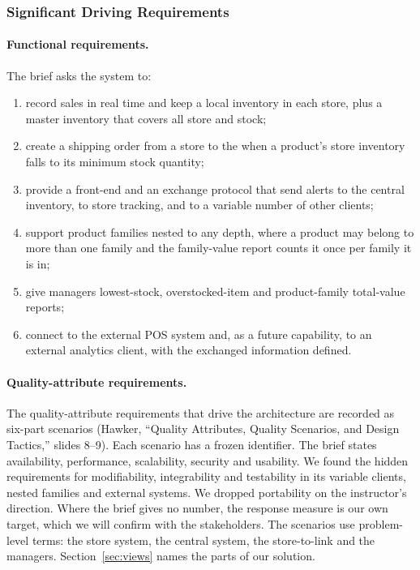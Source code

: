 \subsubsection{Significant Driving Requirements}
\label{sec:driving-requirements}

\paragraph{Functional requirements.}
The brief asks the system to:
\begin{enumerate}[label=FR-\arabic*,nosep,leftmargin=3.2em]
  \item record sales in real time and keep a local inventory in each store, plus a
  master inventory that covers all store and \DC stock;
  \item create a shipping order from a store to the \DC when a product's store inventory
  falls to its minimum stock quantity;
  \item provide a front-end and an exchange protocol that send alerts to the central
  inventory, to store tracking, and to a variable number of other clients;
  \item support product families nested to any depth, where a product may belong to more
  than one family and the family-value report counts it once per family it is in;
  \item give managers lowest-stock, overstocked-item and product-family total-value
  reports;
  \item connect to the external POS system and, as a future capability, to an external
  analytics client, with the exchanged information defined.
\end{enumerate}

\paragraph{Quality-attribute requirements.}
The quality-attribute requirements that drive the architecture are recorded as
six-part scenarios (Hawker, ``Quality Attributes, Quality Scenarios, and Design
Tactics,'' slides 8--9). Each scenario has a frozen identifier. The brief states
availability, performance, scalability, security and usability. We found the hidden
requirements for modifiability, integrability and testability in its variable clients,
nested families and external systems. We dropped portability on the instructor's
direction. Where the brief gives no number, the response measure is our own target, which
we will confirm with the stakeholders. The scenarios use problem-level terms: the store
system, the central system, the store-to-\DC link and the managers. Section~\ref{sec:views}
names the parts of our solution.

